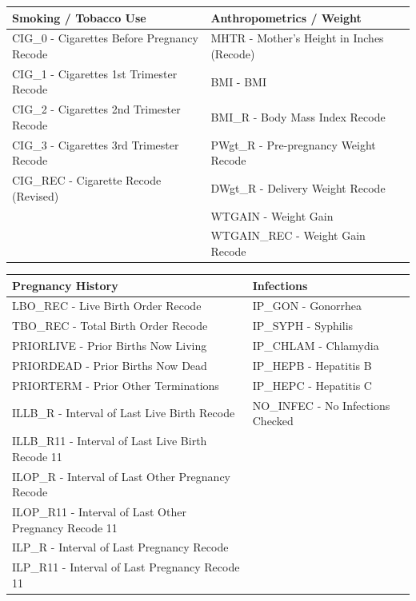 \documentclass[a4paper,12pt]{article} %
\begin{document}
\begin{table}[H]
\centering
\small
\begin{tabular}{|>{\columncolor{smoking_use}}l|>{\columncolor{anthropometrics}}l|}
\hline
\textbf{Smoking / Tobacco Use} & \textbf{Anthropometrics / Weight} \\
\hline
CIG\_0 -  Cigarettes Before Pregnancy Recode& MHTR -  Mother’s Height in Inches (Recode)\\
CIG\_1 -  Cigarettes 1st Trimester Recode& BMI -  BMI\\
CIG\_2 -  Cigarettes 2nd Trimester Recode& BMI\_R -  Body Mass Index Recode\\
CIG\_3 -  Cigarettes 3rd Trimester Recode& PWgt\_R -  Pre-pregnancy Weight Recode\\
CIG\_REC -  Cigarette Recode (Revised)& DWgt\_R -  Delivery Weight Recode\\
 & WTGAIN -  Weight Gain\\
 & WTGAIN\_REC -  Weight Gain Recode\\
\hline
\end{tabular}
\end{table}

\begin{table}[H]
\centering
\small
\begin{tabular}{|>{\columncolor{pregnancy_hist}}l|>{\columncolor{Infections}}l|}
\hline
\textbf{Pregnancy History} & \textbf{Infections} \\
\hline
LBO\_REC -  Live Birth Order Recode& IP\_GON -  Gonorrhea\\
TBO\_REC -  Total Birth Order Recode& IP\_SYPH -  Syphilis\\
PRIORLIVE -  Prior Births Now Living& IP\_CHLAM -  Chlamydia\\
PRIORDEAD -  Prior Births Now Dead& IP\_HEPB -  Hepatitis B\\
PRIORTERM -  Prior Other Terminations& IP\_HEPC -  Hepatitis C\\
ILLB\_R -  Interval of Last Live Birth Recode& NO\_INFEC -  No Infections Checked\\
ILLB\_R11 -  Interval of Last Live Birth Recode 11&  \\
ILOP\_R -  Interval of Last Other Pregnancy Recode&  \\
ILOP\_R11 -  Interval of Last Other Pregnancy Recode 11&  \\
ILP\_R -  Interval of Last Pregnancy Recode&  \\
ILP\_R11 -   Interval of Last Pregnancy Recode 11&  \\
\hline
\end{tabular}
\end{table}
\end{document}
